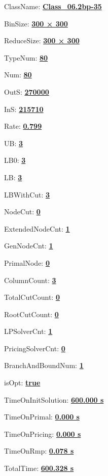 \documentclass[11pt]{article}
\begin{document}
\pagestyle{empty}


ClassName: \underline{\textbf{Class_06.2bp-35}}
\par
BinSize: \underline{\textbf{300 × 300}}
\par
ReduceSize: \underline{\textbf{300 × 300}}
\par
TypeNum: \underline{\textbf{80}}
\par
Num: \underline{\textbf{80}}
\par
OutS: \underline{\textbf{270000}}
\par
InS: \underline{\textbf{215710}}
\par
Rate: \underline{\textbf{0.799}}
\par
UB: \underline{\textbf{3}}
\par
LB0: \underline{\textbf{3}}
\par
LB: \underline{\textbf{3}}
\par
LBWithCut: \underline{\textbf{3}}
\par
NodeCut: \underline{\textbf{0}}
\par
ExtendedNodeCnt: \underline{\textbf{1}}
\par
GenNodeCnt: \underline{\textbf{1}}
\par
PrimalNode: \underline{\textbf{0}}
\par
ColumnCount: \underline{\textbf{3}}
\par
TotalCutCount: \underline{\textbf{0}}
\par
RootCutCount: \underline{\textbf{0}}
\par
LPSolverCnt: \underline{\textbf{1}}
\par
PricingSolverCnt: \underline{\textbf{0}}
\par
BranchAndBoundNum: \underline{\textbf{1}}
\par
isOpt: \underline{\textbf{true}}
\par
TimeOnInitSolution: \underline{\textbf{600.000 s}}
\par
TimeOnPrimal: \underline{\textbf{0.000 s}}
\par
TimeOnPricing: \underline{\textbf{0.000 s}}
\par
TimeOnRmp: \underline{\textbf{0.078 s}}
\par
TotalTime: \underline{\textbf{600.328 s}}
\par
\newpage
\end{document}
